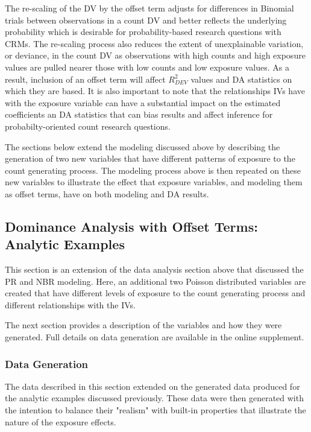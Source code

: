 \documentclass[ShortAfour,times,sageapa]{sagej}
\begin{document}
	The re-scaling of the DV by the offset term adjusts for differences in Binomial trials between observations in a count DV and better reflects the underlying probability which is desirable for probability-based research questions with CRMs.
	The re-scaling process also reduces the extent of unexplainable variation, or deviance, in the count DV as observations with high counts and high exposure values are pulled nearer those with low counts and low exposure values.	
	As a result, inclusion of an offset term will affect $R^2_{DEV}$ values and DA statistics on which they are based.
	It is also important to note that the relationships IVs have with the exposure variable can have a substantial impact on the estimated coefficients an DA statistics that can bias results and affect inference for probabilty-oriented count research questions.
	
	The sections below extend the modeling discussed above by describing the generation of two new variables that have different patterns of exposure to the count generating process. 
	The modeling process above is then repeated on these new variables to illustrate the effect that exposure variables, and modeling them as offset terms, have on both modeling and DA results.
	
	\subsection{Dominance Analysis with Offset Terms: Analytic Examples}
	
	This section is an extension of the data analysis section above that discussed the PR and NBR modeling.
	Here, an additional two Poisson distributed variables are created that have different levels of exposure to the count generating process and different relationships with the IVs.
	
	The next section provides a description of the variables and how they were generated. Full details on data generation are available in the online supplement.
	
		\subsubsection{Data Generation}
		
	The data described in this section extended on the generated data produced for the analytic examples discussed previously.
	These data were then generated with the intention to balance their "realism" with built-in properties that illustrate the nature of the exposure effects.
	
\end{document}
